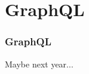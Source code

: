 \section{GraphQL}

\frame{\tableofcontents[currentsection]}

\begin{frame}
    \frametitle{GraphQL}

    Maybe next year...
\end{frame}